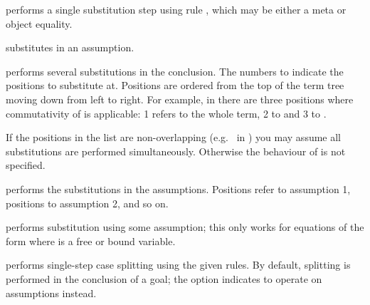 \begin{isabellebody}
\begin{isamarkuptext}
  \begin{descr}

  \item [\mbox{\isa{subst}}~\isa{eq}] performs a single substitution
  step using rule , which may be either a meta or object
  equality.

  \item [\mbox{\isa{subst}}~\isa{{\isacharparenleft}asm{\isacharparenright}\ eq}] substitutes in an
  assumption.

  \item [\mbox{\isa{subst}}~\isa{{\isacharparenleft}i\ {\isasymdots}\ j{\isacharparenright}\ eq}] performs several
  substitutions in the conclusion. The numbers  to 
  indicate the positions to substitute at.  Positions are ordered from
  the top of the term tree moving down from left to right. For
  example, in  there are three positions
  where commutativity of \isa{{\isacharplus}} is applicable: 1 refers to the
  whole term, 2 to  and 3 to .

  If the positions in the list  are non-overlapping
  (e.g.\  in ) you may
  assume all substitutions are performed simultaneously.  Otherwise
  the behaviour of  is not specified.

  \item [\mbox{\isa{subst}}~\isa{{\isacharparenleft}asm{\isacharparenright}\ {\isacharparenleft}i\ {\isasymdots}\ j{\isacharparenright}\ eq}] performs the
  substitutions in the assumptions.  Positions 
  refer to assumption 1, positions 
  to assumption 2, and so on.

  \item [\mbox{\isa{hypsubst}}] performs substitution using some
  assumption; this only works for equations of the form  where  is a free or bound variable.

  \item [\mbox{\isa{split}}~\isa{a\isactrlsub {\isadigit{1}}\ {\isasymdots}\ a\isactrlsub n}] performs
  single-step case splitting using the given rules.  By default,
  splitting is performed in the conclusion of a goal; the  option indicates to operate on assumptions instead.
  

\end{descr}
\end{isamarkuptext}
\end{isabellebody}
